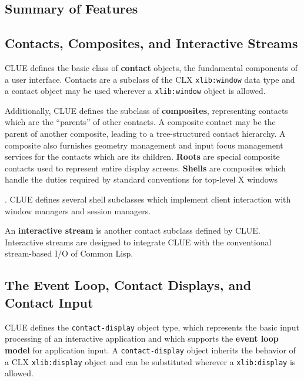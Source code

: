 \documentclass[twoside]{book}
\begin{document}
\begin{sloppy}
\section{Summary of Features}

\subsection{Contacts, Composites, and Interactive Streams}

CLUE defines the basic class of {\bf contact} objects, the fundamental
components of a user interface.  Contacts are a
subclass of the CLX {\tt xlib:window}  data type and a
contact object may be used wherever a {\tt xlib:window} object is
allowed.

Additionally, CLUE defines the subclass of {\bf composites},
representing contacts which are the ``parents'' of other contacts. A
composite contact may be the parent of another composite, leading to a
tree-structured contact hierarchy.  A composite also
furnishes geometry management and input focus management services for
the contacts which are its children. {\bf Roots}  are
special composite contacts used to represent entire display
screens. {\bf Shells}  are composites which handle the
duties required by standard conventions for top-level X
windows \cite{icccm}

. CLUE defines
several shell subclasses which implement client interaction with
window managers and session managers.

An {\bf interactive stream} is another contact subclass defined by
CLUE. Interactive streams are designed to integrate CLUE with the
conventional stream-based I/O of Common
Lisp.

\subsection{The Event Loop, Contact Displays, and Contact Input}

CLUE defines the {\tt contact-display} object type, which represents
the basic input processing of an interactive application and which
supports the {\bf event loop model}  for
application input. A {\tt contact-display} object inherits the
behavior of a CLX {\tt xlib:display} object  and can be
substituted wherever a {\tt xlib:display} is allowed.


\end{sloppy}
\end{document}
